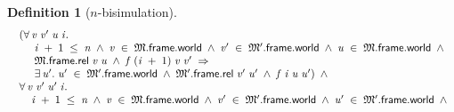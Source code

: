 \documentclass[letterpaper]{article}
\newtheorem{defn}{Definition}
\newenvironment{holmath}{\begin{displaymath}\begin{array}{l}}{\end{array}\end{displaymath}\ignorespacesafterend}
\begin{document}
\begin{defn}[$n$-bisimulation]
\begin{holmath}
\;\;(\HOLSymConst{\HOLTokenForall{}}\HOLBoundVar{v}\;\HOLBoundVar{v\sp{\prime}}\;\HOLBoundVar{u}\;\HOLBoundVar{i}.\\
\;\;\;\;\;\;\;\HOLBoundVar{i}\;\HOLSymConst{\ensuremath{+}}\;\HOLNumLit{1}\;\HOLSymConst{\HOLTokenLeq{}}\;\HOLFreeVar{n}\;\HOLSymConst{\HOLTokenConj{}}\;\HOLBoundVar{v}\;\HOLSymConst{\HOLTokenIn{}}\;\HOLFreeVar{\ensuremath{\mathfrak{M}}}.\HOLFieldName{frame}.\HOLFieldName{world}\;\HOLSymConst{\HOLTokenConj{}}\;\HOLBoundVar{v\sp{\prime}}\;\HOLSymConst{\HOLTokenIn{}}\;\HOLFreeVar{\ensuremath{\mathfrak{M}'}}.\HOLFieldName{frame}.\HOLFieldName{world}\;\HOLSymConst{\HOLTokenConj{}}\;\HOLBoundVar{u}\;\HOLSymConst{\HOLTokenIn{}}\;\HOLFreeVar{\ensuremath{\mathfrak{M}}}.\HOLFieldName{frame}.\HOLFieldName{world}\;\HOLSymConst{\HOLTokenConj{}}\\
\;\;\;\;\;\;\;\HOLFreeVar{\ensuremath{\mathfrak{M}}}.\HOLFieldName{frame}.\HOLFieldName{rel}\;\HOLBoundVar{v}\;\HOLBoundVar{u}\;\HOLSymConst{\HOLTokenConj{}}\;\HOLFreeVar{f}\;(\HOLBoundVar{i}\;\HOLSymConst{\ensuremath{+}}\;\HOLNumLit{1})\;\HOLBoundVar{v}\;\HOLBoundVar{v\sp{\prime}}\;\HOLSymConst{\HOLTokenImp{}}\\
\;\;\;\;\;\;\;\HOLSymConst{\HOLTokenExists{}}\HOLBoundVar{u\sp{\prime}}.\;\HOLBoundVar{u\sp{\prime}}\;\HOLSymConst{\HOLTokenIn{}}\;\HOLFreeVar{\ensuremath{\mathfrak{M}'}}.\HOLFieldName{frame}.\HOLFieldName{world}\;\HOLSymConst{\HOLTokenConj{}}\;\HOLFreeVar{\ensuremath{\mathfrak{M}'}}.\HOLFieldName{frame}.\HOLFieldName{rel}\;\HOLBoundVar{v\sp{\prime}}\;\HOLBoundVar{u\sp{\prime}}\;\HOLSymConst{\HOLTokenConj{}}\;\HOLFreeVar{f}\;\HOLBoundVar{i}\;\HOLBoundVar{u}\;\HOLBoundVar{u\sp{\prime}})\;\HOLSymConst{\HOLTokenConj{}}\\
\;\;\HOLSymConst{\HOLTokenForall{}}\HOLBoundVar{v}\;\HOLBoundVar{v\sp{\prime}}\;\HOLBoundVar{u\sp{\prime}}\;\HOLBoundVar{i}.\\
\;\;\;\;\;\;\HOLBoundVar{i}\;\HOLSymConst{\ensuremath{+}}\;\HOLNumLit{1}\;\HOLSymConst{\HOLTokenLeq{}}\;\HOLFreeVar{n}\;\HOLSymConst{\HOLTokenConj{}}\;\HOLBoundVar{v}\;\HOLSymConst{\HOLTokenIn{}}\;\HOLFreeVar{\ensuremath{\mathfrak{M}}}.\HOLFieldName{frame}.\HOLFieldName{world}\;\HOLSymConst{\HOLTokenConj{}}\;\HOLBoundVar{v\sp{\prime}}\;\HOLSymConst{\HOLTokenIn{}}\;\HOLFreeVar{\ensuremath{\mathfrak{M}'}}.\HOLFieldName{frame}.\HOLFieldName{world}\;\HOLSymConst{\HOLTokenConj{}}\;\HOLBoundVar{u\sp{\prime}}\;\HOLSymConst{\HOLTokenIn{}}\;\HOLFreeVar{\ensuremath{\mathfrak{M}'}}.\HOLFieldName{frame}.\HOLFieldName{world}\;\HOLSymConst{\HOLTokenConj{}}\\

\end{holmath}
\end{defn}
\end{document}
